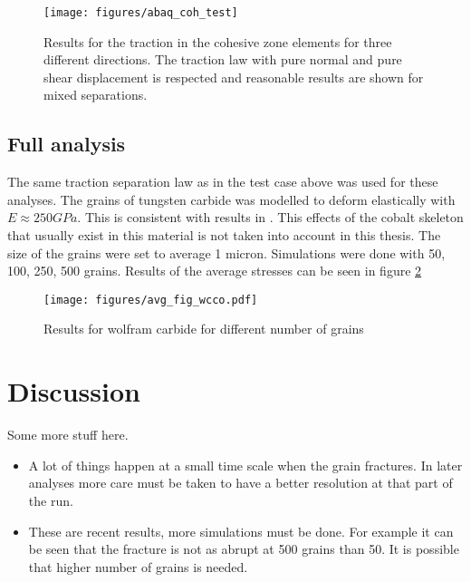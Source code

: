 \documentclass[wcco.tex]{subfiles}
\begin{document}
\begin{figure}[ht]
\centering
\texttt{[image: figures/abaq\_coh\_test]}
\caption{Results for the traction in the cohesive zone elements for three different directions. The traction law with pure normal and pure shear displacement is respected and reasonable results are shown for mixed separations. }
\label{fig:test_cases}
\end{figure}


\subsection{Full analysis}

The same traction separation law as in the test case above was used for these analyses. The grains of tungsten carbide was modelled to deform elastically with $E \approx 250GPa$. This is consistent with results in \cite{Buss04}.
This effects of the cobalt skeleton that usually exist in this material is not taken into account in this thesis. The size of the grains were set to average 1 micron. Simulations were done with 50, 100, 250, 500 grains. Results of the average stresses can be seen in figure \ref{fig:wcco_res}

\begin{figure}[ht]
\centering
\texttt{[image: figures/avg\_fig\_wcco.pdf]}
\caption{Results for wolfram carbide for different number of grains}
\label{fig:wcco_res}
\end{figure}


\section{Discussion}
Some more stuff here.
\begin{itemize}
\item A lot of things happen at a small time scale when the grain fractures. In later analyses more care must be taken to have a better resolution at that part of the run.
\item These are recent results, more simulations must be done. For example it can be seen that the fracture is not as abrupt at 500 grains than 50. It is possible that higher number of grains is needed.
\end{itemize}
\end{document}
